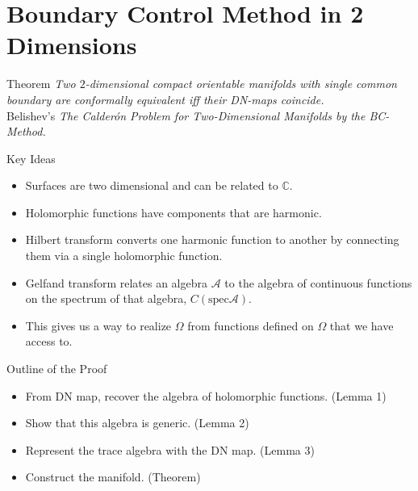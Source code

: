 \documentclass[aspectratio=169]{beamer}
\newcommand{\C}{\mathbb{C}}
\newcommand{\algebra}{\mathcal{A}}
\newcommand{\spec}{\mathrm{spec}}
\begin{document}
\section{Boundary Control Method in 2 Dimensions}

\begin{frame}{Theorem}
    \pause
    \emph{Two $2$-dimensional compact orientable manifolds with single common boundary are conformally equivalent iff their DN-maps coincide.}\\
    
    \vspace*{1cm}
    Belishev's \emph{The Calder\'on Problem for Two-Dimensional Manifolds by the BC-Method.}
\end{frame}


\begin{frame}{Key Ideas}
\vfill
\pause
    \begin{itemize}
        \item Surfaces are two dimensional and can be related to $\C$.
        
        \pause
        \item Holomorphic functions have components that are harmonic.
        
        \pause
        \item Hilbert transform converts one harmonic function to another by connecting them via a single holomorphic function.
        
        \pause
        \item Gelfand transform relates an algebra $\algebra$ to the algebra of continuous functions on the spectrum of that algebra, $C(\spec \algebra)$.
        
        \pause
        \item This gives us a way to realize $\Omega$ from functions defined on $\Omega$ that we have access to.
    \end{itemize}
\vfill
\end{frame}

\begin{frame}{Outline of the Proof}
\vfill
\pause
    \begin{itemize}
        \item From DN map, recover the algebra of holomorphic functions. (Lemma 1)
        
        \pause
        \item Show that this algebra is generic. (Lemma 2)
        
        \pause
        \item Represent the trace algebra with the DN map. (Lemma 3)
        
        \pause
        \item Construct the manifold. (Theorem)
    \end{itemize}
\vfill
\end{frame}
\end{document}
